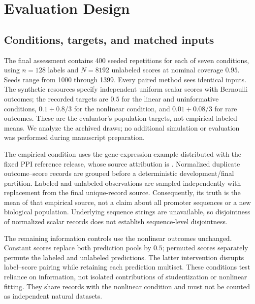 \documentclass{article}
\begin{document}
\section{Evaluation Design}
\subsection{Conditions, targets, and matched inputs}
The final assessment contains 400 seeded repetitions for each of seven conditions, using $n=128$ labels and $N=8192$ unlabeled scores at nominal coverage $0.95$. Seeds range from 1000 through 1399. Every paired method sees identical inputs. The synthetic resources specify independent uniform scalar scores with Bernoulli outcomes; the recorded targets are $0.5$ for the linear and uninformative conditions, $0.1+0.8/3$ for the nonlinear condition, and $0.01+0.08/3$ for rare outcomes. These are the evaluator's population targets, not empirical labeled means. We analyze the archived draws; no additional simulation or evaluation was performed during manuscript preparation.

The empirical condition uses the gene-expression example distributed with the fixed PPI reference release, whose source attribution is \citet{Vaishnav}. Normalized duplicate outcome--score records are grouped before a deterministic development/final partition. Labeled and unlabeled observations are sampled independently with replacement from the final unique-record source. Consequently, its truth is the mean of that empirical source, not a claim about all promoter sequences or a new biological population. Underlying sequence strings are unavailable, so disjointness of normalized scalar records does not establish sequence-level disjointness.

The remaining information controls use the nonlinear outcomes unchanged. Constant scores replace both prediction pools by $0.5$; permuted scores separately permute the labeled and unlabeled predictions. The latter intervention disrupts label--score pairing while retaining each prediction multiset. These conditions test reliance on information, not isolated contributions of studentization or nonlinear fitting. They share records with the nonlinear condition and must not be counted as independent natural datasets.
\end{document}
